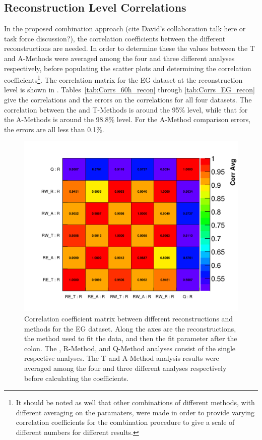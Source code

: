 \clearpage
\subsection{Reconstruction Level Correlations}
\label{sub:reconcorrelations}

In the proposed combination approach (cite David's collaboration talk here or task force discussion?), the correlation coefficients between the different reconstructions are needed. In order to determine these the \R values between the \RW T and A-Methods were averaged among the four and three different analyses respectively, before populating the scatter plots and determining the correlation coefficients\footnote{It should be noted as well that other combinations of different methods, with different averaging on the \R paramaters, were made in order to provide varying correlation coefficients for the combination procedure to give a scale of different numbers for different results.}. The correlation matrix for the EG dataset at the reconstruction level is shown in . Tables~\ref{tab:Corrs_60h_recon} through \ref{tab:Corrs_EG_recon} give the correlations and the errors on the correlations for all four datasets. The correlation between the \RE and \RW T-Methods is around the 95\% level, while that for the A-Methods is around the 98.8\% level. For the A-Method comparison errors, the errors are all less than 0.1\%.



\begin{figure}[h]
\centering
\includegraphics[width=\textwidth]{Avg_Recon_CorrelationMatrix_R_R}
\caption{Correlation coefficient matrix between different reconstructions and methods for the EG dataset. Along the axes are the reconstructions, the method used to fit the data, and then the fit parameter after the colon. The \RE, R-Method, and Q-Method analyses consist of the single respective analyses. The \RW T and A-Method analysis results were averaged among the four and three different analyses respectively before calculating the coefficients.}
\label{fig:corrMatRecon}
\end{figure}



